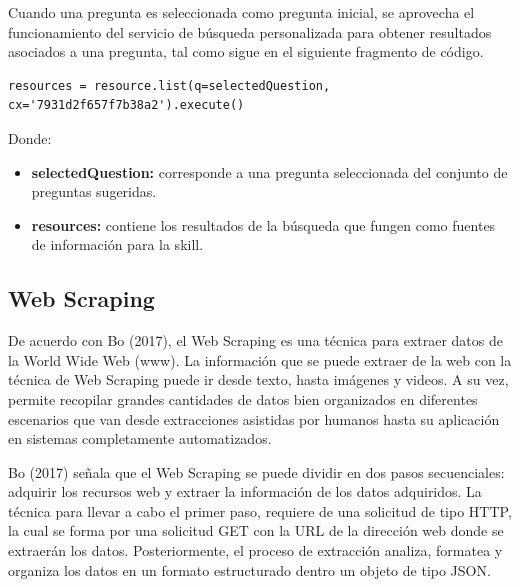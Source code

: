 Cuando una pregunta es seleccionada como pregunta inicial, se aprovecha el funcionamiento del servicio de búsqueda personalizada para obtener resultados asociados a una pregunta, tal como sigue en el siguiente fragmento de código.

\begin{tcolorbox}[colback=white!25!white,colframe=blue]
  \begin{verbatim}
resources = resource.list(q=selectedQuestion, cx='7931d2f657f7b38a2').execute()
  \end{verbatim}
\end{tcolorbox}

Donde:

\begin{itemize}
  \item \textbf{selectedQuestion:} corresponde a una pregunta seleccionada del conjunto de preguntas sugeridas.
  \item \textbf{resources:} contiene los resultados de la búsqueda que fungen como fuentes de información para la skill.
\end{itemize}


\subsection{Web Scraping}
\label{WebScrapingcapIV}

De acuerdo con Bo (2017), el Web Scraping es una técnica para extraer datos de la World Wide Web (www). La información que se puede extraer de la web con la técnica de Web Scraping puede ir desde texto, hasta imágenes y videos. A su vez, permite recopilar grandes cantidades de datos bien organizados en diferentes escenarios que van desde extracciones asistidas por humanos hasta su aplicación en sistemas completamente automatizados.

Bo (2017) señala que el Web Scraping se puede dividir en dos pasos secuenciales: adquirir los recursos web y extraer la información de los datos adquiridos. La técnica para llevar a cabo el primer paso, requiere de una solicitud de tipo HTTP, la cual se forma por una solicitud GET con la URL de la dirección web donde se extraerán los datos. Posteriormente, el proceso de extracción analiza, formatea y organiza los datos en un formato estructurado dentro un objeto de tipo JSON.

